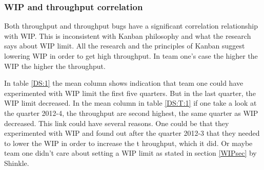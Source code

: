 \documentclass[UKenglish]{ifimaster}  %
\begin{document}
 \begin{table}[!htbp]
  \centering
      \caption{Descriptive statistics for WIP - Team one}
  \label{DS:1}%
\end{table}%
\newpage

\subsubsection{WIP and throughput correlation}
Both throughput and throughput bugs have a significant correlation relationship with WIP. This is inconsistent with Kanban philosophy and what the research says about WIP limit.  All the research and the principles of Kanban suggest lowering WIP in order to get high throughput. In team one's case the higher the WIP the higher the throughput.  

In table \ref{DS:1} the mean column shows indication that team one could have experimented with WIP limit the first five quarters. But in the last quarter, the WIP limit decreased.  In the mean column in table \ref{DS:T:1}  if one take a look at the quarter 2012-4, the throughput are second highest, the same quarter as WIP decreased.  This link could have several reasons. One could be that they experimented with WIP and found out after the quarter 2012-3 that they needed to lower the WIP in order to increase the t hroughput, which it did.  Or maybe team one didn't care about setting a WIP limit as stated in section \ref{WIPsec} by Shinkle. %
\end{document}
